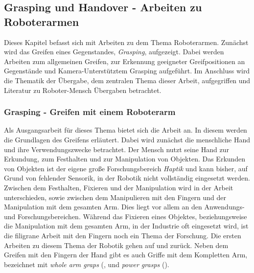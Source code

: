 \subsection{Grasping und Handover - Arbeiten zu Roboterarmen}
\label{sec:relatedwork-handover}
Dieses Kapitel befasst sich mit Arbeiten zu dem Thema Roboterarmen. Zunächst wird das Greifen eines Gegenstandes, \textit{Grasping}, aufgezeigt. Dabei werden Arbeiten zum allgemeinen Greifen, zur Erkennung geeigneter Greifpositionen an Gegenstände und Kamera-Unterstütztem Grasping aufgeführt. Im Anschluss wird die Thematik der Übergabe, dem zentralen Thema dieser Arbeit, aufgegriffen und Literatur zu Roboter-Mensch Übergaben betrachtet.

\subsubsection{Grasping - Greifen mit einem Roboterarm}
Als Ausgangsarbeit für dieses Thema bietet sich die Arbeit \cite{bicchi2000robotic} an. In diesem werden die Grundlagen des Greifens erläutert. Dabei wird zunächst die menschliche Hand und ihre Verwendungszwecke betrachtet. Der Mensch nutzt seine Hand zur Erkundung, zum Festhalten und zur Manipulation von Objekten. Das Erkunden von Objekten ist der eigene große Forschungsbereich \textit{Haptik} und kann bisher, auf Grund von fehlender Sensorik, in der Robotik nicht vollständig eingesetzt werden. Zwischen dem Festhalten, Fixieren und der Manipulation wird in der Arbeit unterschieden, sowie zwischen dem Manipulieren mit den Fingern und der Manipulation mit dem gesamten Arm. Dies liegt vor allem an den Anwendungs- und Forschungsbereichen. Während das Fixieren eines Objektes, beziehungsweise die Manipulation mit dem gesamten Arm, in der Industrie oft eingesetzt wird, ist die filigrane Arbeit mit den Fingern noch ein Thema der Forschung. Die ersten Arbeiten zu diesem Thema der Robotik gehen auf \cite{asada1979studies}  und \cite{mason1985robot} zurück. Neben dem Greifen mit den Fingern der Hand gibt es auch Griffe mit dem Kompletten Arm, bezeichnet mit \textit{whole arm graps} (\cite{townsend1988effect}, \cite{bicchi1994problem} und \textit{power grasps} (\cite{mirza1990force}). \cite{bicchi2000robotic}

